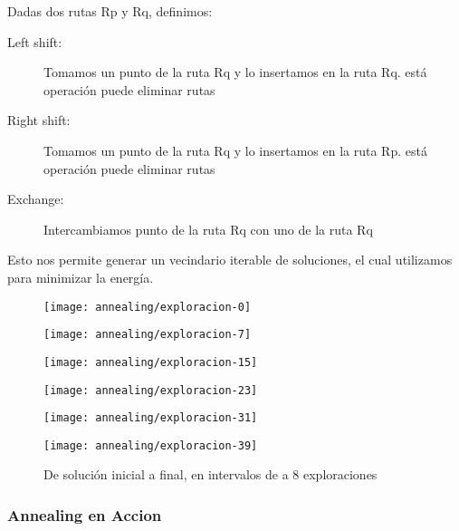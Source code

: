 Dadas dos rutas Rp y Rq, definimos:

\begin{description}
\item[Left shift:] Tomamos un punto de la ruta Rq y lo insertamos en la ruta Rq. está operación puede eliminar rutas

\item[Right shift:] Tomamos un punto de la ruta Rq y lo insertamos en la ruta Rp. está operación puede eliminar rutas

\item[Exchange:] Intercambiamos punto de la ruta Rq con uno de la ruta Rq
\end{description}

Esto nos permite generar un vecindario iterable de soluciones, el cual utilizamos para minimizar la energía.


\begin{figure}[H]
	\centering
	\begin{minipage}[t]{.3\textwidth}
		\centering
		\texttt{[image: annealing/exploracion-0]}
	\end{minipage}\qquad
	\begin{minipage}[t]{.3\textwidth}
		\centering
		\texttt{[image: annealing/exploracion-7]}
	\end{minipage}\qquad
		\begin{minipage}[t]{.3\textwidth}
		\centering
		\texttt{[image: annealing/exploracion-15]}
	\end{minipage}\qquad
		\begin{minipage}[t]{.3\textwidth}
		\centering
		\texttt{[image: annealing/exploracion-23]}
	\end{minipage}\qquad
	\begin{minipage}[t]{.3\textwidth}
		\centering
		\texttt{[image: annealing/exploracion-31]}
	\end{minipage}\qquad
		\begin{minipage}[t]{.3\textwidth}
		\centering
		\texttt{[image: annealing/exploracion-39]}
	\end{minipage}\qquad
	
De solución inicial a final, en intervalos de a 8 exploraciones
\end{figure}


\subsubsection{Annealing en Accion}

